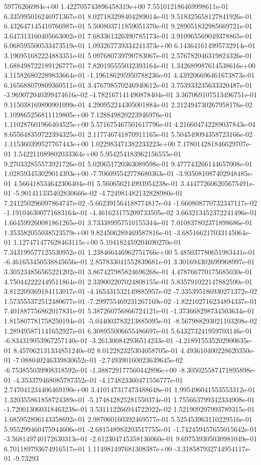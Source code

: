 59776266984e+00	1.422705743896458319e+00	7.551012186469998611e-01	6.335995016246971367e-01	8.027183298404289014e-01	9.518325658127841926e-01	6.432647145410766987e-01	5.500803711859051370e-01	9.289051832985669721e-01	3.647313160405663002e-01	7.683361326390785173e-01	3.910965569049378865e-01	6.068595500533473519e-01	1.093267739334241373e+00	6.143641614995732914e-01	3.196951682224883351e-01	5.097680739790783067e-01	2.576782046319824326e-01	1.688498722189126777e-01	7.820195555032393164e-01	1.342689987614538616e+00	4.115826802289833664e-01	-1.196186295950788236e-01	4.439206696461673873e-01	6.165688079809360511e-01	3.476798570246940612e-01	3.753933235633320487e-01	-3.969072040399474616e-02	-4.782167141490878404e-01	3.367069107513496751e-01	9.115038169890901099e-01	4.290952244305001884e-01	2.212494730267958176e-02	1.109865256811119805e+00	7.128849820223946976e-01	1.110287601966404525e+00	5.571675467501617796e-01	4.216604742289037843e-04	8.655648359722394325e-01	2.117746741870911165e-01	5.504549094358723166e-02	1.115360399527767443e+00	1.022983471382233223e+00	7.178014281846629707e-01	1.542211089802033364e+00	5.954254183962156555e-01	9.270332855573921726e-01	5.020651720363089598e-01	9.477743266144657008e-01	1.028593453029014393e+00	-7.706095542778680363e-01	-3.935081087402948485e-01	4.566418534642306404e-01	5.560656214993954238e-01	3.444772606205675491e-01	-5.901411335402830666e-02	-4.724981482132828980e-01	7.241250296097864747e-02	-5.662391564188774817e-04	-1.660808770732347117e-02	-1.191046300771683164e-01	-4.461623175209733505e-02	3.663213452372241496e-01	1.664599260081861265e-01	3.733389957510155344e-01	7.010837802371898686e-01	1.353582055038523579e+00	9.824506289469587816e-01	-3.685166217033145064e-01	1.127471477628463115e+00	5.104182459204690270e-01	7.343199577125530952e-01	1.238466446962751766e+00	5.485037780651983441e-01	-6.461653450538845656e-01	2.857833041552839681e-01	3.301694302699968997e-01	3.305234856565221202e-01	3.867427985824696268e-01	4.478766770175685030e-01	4.750442222449511864e-01	2.339002207024808155e-01	5.835791022147882590e-01	3.812209369184113017e-01	-4.165431532149885957e-02	-7.335395186930271372e-02	1.573555372512480677e-01	-7.299755469231267169e-02	-1.822102716234894337e-01	7.401887756862017831e-01	5.387260756866724121e-01	-1.373668298734503634e-01	1.815807781758250194e-01	-5.044003783213885095e-01	-8.567988293021103208e-02	1.289495871141652927e-01	6.308955006655486697e-01	5.643273241959703146e-01	-6.834319053967257140e-01	-3.261300842936514233e-01	-4.218915535202900635e-01	8.457062131334851240e-02	8.012282325304058705e-01	4.493610400228620350e-01	-7.088040246339830652e-01	-2.749390160023639645e-02	-6.753855039908318592e-01	-1.388729177560442896e+00	-8.305025587471895898e-01	-4.353379468085787352e-01	-4.174823360471556777e-01	2.747041234406469190e+00	3.410147317473488648e-01	1.995496041553553312e-01	1.320355861858724389e-01	-5.174842825281550374e-01	1.755663799342334908e-01	-1.720013060318463238e-01	3.531112266944722022e-02	1.521909207993789315e-01	1.685952896143358692e-01	2.987060160392469577e-01	5.525453963110229516e-01	5.955299460475944606e-01	-2.681548983203517755e-01	-1.742459457655015642e-01	-3.568149740172630313e-01	-2.612304745358136060e-01	9.697539305030981049e-01	6.701189793674916517e-01	1.114981497681308387e+00	-3.318587932744954117e-01	-9.73293